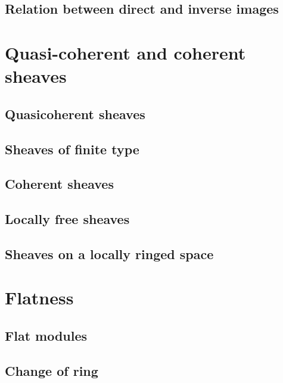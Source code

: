         \subsection{Relation between direct and inverse images}
        

    \section{Quasi-coherent and coherent sheaves}

        \subsection{Quasicoherent sheaves}
        

        \subsection{Sheaves of finite type}
        

        \subsection{Coherent sheaves}
        

        \subsection{Locally free sheaves}
        

        \subsection{Sheaves on a locally ringed space}
        

    \section{Flatness}

        \subsection{Flat modules}
        

        \subsection{Change of ring}
        


